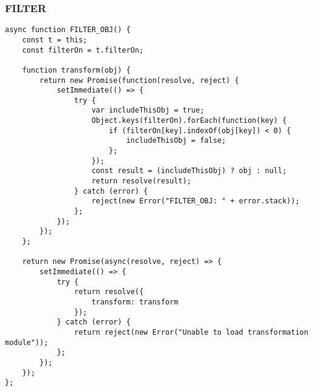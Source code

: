 \subsubsection{FILTER}
\label{netl-trans-filter-obj}
\begin{verbatim}
async function FILTER_OBJ() {
    const t = this;
    const filterOn = t.filterOn;

    function transform(obj) {
        return new Promise(function(resolve, reject) {
            setImmediate(() => {
                try {
                    var includeThisObj = true;
                    Object.keys(filterOn).forEach(function(key) {
                        if (filterOn[key].indexOf(obj[key]) < 0) {
                            includeThisObj = false;
                        };
                    });
                    const result = (includeThisObj) ? obj : null;
                    return resolve(result);
                } catch (error) {
                    reject(new Error("FILTER_OBJ: " + error.stack));
                };
            });
        });
    };

    return new Promise(async(resolve, reject) => {
        setImmediate(() => {
            try {
                return resolve({
                    transform: transform
                });
            } catch (error) {
                return reject(new Error("Unable to load transformation module"));
            };
        });
    });
};
\end{verbatim}

